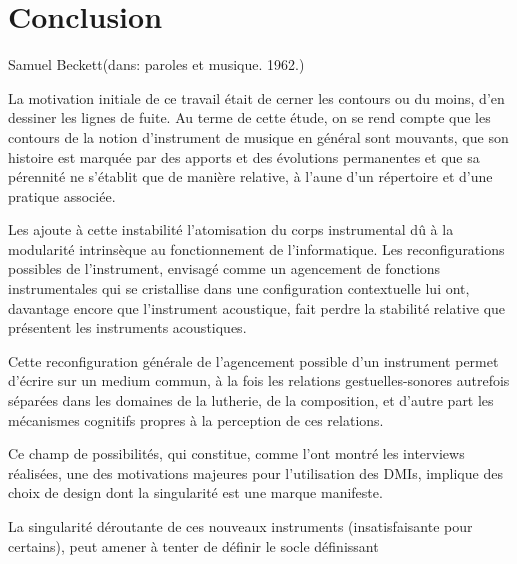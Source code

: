 %
\chapter{Conclusion}
\label{ch:conclusion}

{Samuel Beckett}{(dans: paroles et musique. 1962.)}


\noindent La motivation initiale de ce travail était de cerner les contours ou du moins, d'en dessiner les lignes de fuite. Au terme de cette étude, on se rend compte que les contours de la notion d'instrument de musique en général sont mouvants, que son histoire est marquée par des apports et des évolutions permanentes et que sa pérennité ne s'établit que de manière relative, à l'aune d'un répertoire et d'une pratique associée.

Les  ajoute à cette instabilité l'atomisation du corps instrumental dû à la modularité intrinsèque au fonctionnement de l'informatique. Les reconfigurations possibles de l'instrument, envisagé comme un agencement de fonctions instrumentales qui se cristallise dans une configuration contextuelle lui ont, davantage encore que l'instrument acoustique, fait perdre la stabilité relative que présentent les instruments acoustiques.

Cette reconfiguration générale de l'agencement possible d'un instrument permet d'écrire sur un medium commun, à la fois les relations gestuelles-sonores autrefois séparées dans les domaines de la lutherie, de la composition, et d'autre part les mécanismes cognitifs propres à la perception de ces relations.


Ce champ de possibilités, qui constitue, comme l'ont montré les interviews réalisées, une des motivations majeures pour l'utilisation des \glspl{DMI}, implique des choix de design dont la singularité est une marque manifeste. 

La singularité déroutante de ces nouveaux instruments (insatisfaisante pour certains), peut amener à tenter de définir le socle définissant


